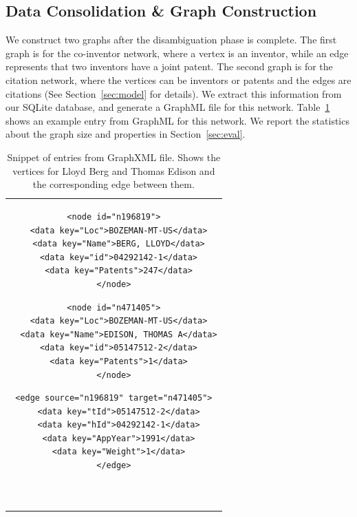 \subsection{Data Consolidation \& Graph Construction}

We construct two graphs after the disambiguation phase is complete. 
The first graph is for the co-inventor network, where a vertex is an inventor, while an edge represents that two inventors have a joint patent. The second graph is for the citation network, where the vertices can be inventors or patents and the edges are citations (See Section~\ref{sec:model} for details).
We extract this information from our SQLite database, and generate a GraphML file for this network.
Table~\ref{listing} shows an example entry from GraphML for this network.
We report the statistics about the graph size and properties in Section~\ref{sec:eval}.

\begin{table}[h] 
  \centering
  \begin{tabular}{@{}c@{}} 

  \begin{minipage}{0.25\linewidth}

\begin{lstlisting}[]
<node id="n196819">
  <data key="Loc">BOZEMAN-MT-US</data>
  <data key="Name">BERG, LLOYD</data>
  <data key="id">04292142-1</data>
  <data key="Patents">247</data>
</node>
\end{lstlisting}

  \end{minipage}
  \hspace{0.05\linewidth}
  \begin{minipage}{0.3\linewidth}

\begin{lstlisting}[]
<node id="n471405">
  <data key="Loc">BOZEMAN-MT-US</data>
  <data key="Name">EDISON, THOMAS A</data>
  <data key="id">05147512-2</data>
  <data key="Patents">1</data>
</node>
\end{lstlisting}

  \end{minipage}
  \hspace{0.05\linewidth}
  \begin{minipage}{0.3\linewidth}

\begin{lstlisting}[]
<edge source="n196819" target="n471405">
  <data key="tId">05147512-2</data>
  <data key="hId">04292142-1</data>
  <data key="AppYear">1991</data>
  <data key="Weight">1</data>
</edge>



\end{lstlisting}

  \end{minipage}
  
  \end{tabular}

\label{listing}
\caption{\footnotesize Snippet of entries from GraphXML file. Shows the vertices for Lloyd Berg and Thomas Edison and the corresponding edge between them.}
\end{table}